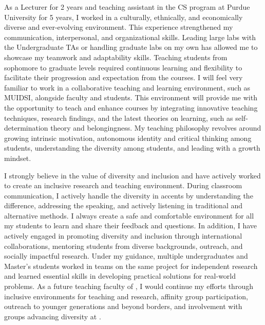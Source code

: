 \documentclass[11pt]{article}
\renewcommand*\paragraph[1]{}
\begin{document}
As a Lecturer for 2 years and teaching assistant in the CS program at Purdue University for 5 years, I worked in a culturally, ethnically, and economically diverse and ever-evolving environment. This experience strengthened my communication, interpersonal, and organizational skills. 
Leading large labs with the Undergraduate TAs or handling graduate labs on my own has allowed me to showcase my teamwork and adaptability skills. Teaching students from sophomore to graduate levels required continuous learning and flexibility to facilitate their progression and expectation from the courses.
%
I will feel very familiar to work in a collaborative teaching and learning environment, such as 
MUIDSI, alongside faculty and students. This environment will provide me with the opportunity to teach and enhance courses by integrating innovative teaching techniques, research findings, and the latest theories on learning, such as self-determination theory and belongingness.
My teaching philosophy revolves around growing intrinsic motivation, autonomous identity and critical thinking among students, understanding the diversity among students, and leading with a growth mindset.
%


\paragraph{P4) The ability to contribute through teaching and/or service to the diversity, cultural sensitivity, and excellence of the academic community.}
\paragraph{Diversity}
I strongly believe in the value of diversity and inclusion and have actively worked to create an inclusive research and teaching environment. During classroom communication, I actively handle the diversity in accents by understanding the difference, addressing the speaking, and actively listening in traditional and alternative methods.
I always create a safe and comfortable environment for all my students to learn and share their feedback and questions. In addition, I have actively engaged in promoting diversity and inclusion through international collaborations, mentoring students from diverse backgrounds, outreach, and socially impactful research. Under my guidance, multiple undergraduates and Master's students worked in teams on the same project for independent research and learned essential skills in developing practical solutions for real-world problems. As a future teaching faculty of \shortInstitutionName{}, I would continue my efforts through inclusive environments for teaching and research, affinity group participation, outreach to younger generations and beyond borders, and involvement with groups advancing diversity at \InstitutionName{}. 
\end{document}
